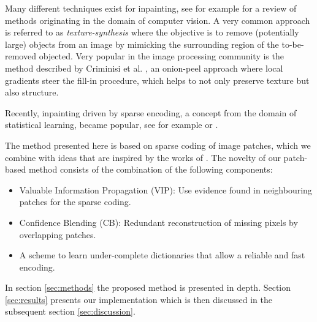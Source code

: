 Many different techniques exist for inpainting, see for example \cite{tauber2007review} for a review of methods originating in the domain of computer vision. A very common approach is referred to as \textit{texture-synthesis} where the objective is to remove (potentially large) objects from an image by mimicking the surrounding region of the to-be-removed objected. Very popular in the image processing community is the method described by Criminisi et al. \cite{criminisi2004region}, an onion-peel approach where local gradients steer the fill-in procedure, which helps to not only preserve texture but also structure.

Recently, inpainting driven by sparse encoding, a concept from the domain of statistical learning, became popular, see for example \cite{fadili2009inpainting} or \cite{elad2005simultaneous}. 

The method presented here is based on sparse coding of image patches, which we combine with ideas that are inspired by the works of \cite{criminisi2004region}. The novelty of our patch-based method consists of the combination of the following components:
\begin{itemize}
   \item Valuable Information Propagation (VIP): Use evidence found in neighbouring patches for the sparse coding.
   \item Confidence Blending (CB): Redundant reconstruction of missing pixels by overlapping patches.
   \item A scheme to learn under-complete dictionaries that allow a reliable and fast encoding.
\end{itemize}

 In section \ref{sec:methods} the proposed method is presented in depth. Section \ref{sec:results} presents our implementation which is then discussed in the subsequent section \ref{sec:discussion}. 